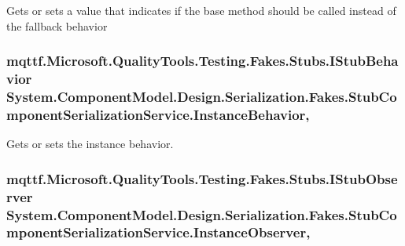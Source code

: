 Gets or sets a value that indicates if the base method should be called instead of the fallback behavior

\hypertarget{class_system_1_1_component_model_1_1_design_1_1_serialization_1_1_fakes_1_1_stub_component_serialization_service_a3d7ed33bcf64bea04776fd4308f7a612}{
\subsubsection[{Instance\-Behavior}]{\setlength{\rightskip}{0pt plus 5cm}mqttf.\-Microsoft.\-Quality\-Tools.\-Testing.\-Fakes.\-Stubs.\-I\-Stub\-Behavior System.\-Component\-Model.\-Design.\-Serialization.\-Fakes.\-Stub\-Component\-Serialization\-Service.\-Instance\-Behavior\hspace{0.3cm}{\ttfamily [get]}, {\ttfamily [set]}}}\label{class_system_1_1_component_model_1_1_design_1_1_serialization_1_1_fakes_1_1_stub_component_serialization_service_a3d7ed33bcf64bea04776fd4308f7a612}


Gets or sets the instance behavior.

\hypertarget{class_system_1_1_component_model_1_1_design_1_1_serialization_1_1_fakes_1_1_stub_component_serialization_service_ac3604c50cf8ba19389054eec8a5bb549}{
\subsubsection[{Instance\-Observer}]{\setlength{\rightskip}{0pt plus 5cm}mqttf.\-Microsoft.\-Quality\-Tools.\-Testing.\-Fakes.\-Stubs.\-I\-Stub\-Observer System.\-Component\-Model.\-Design.\-Serialization.\-Fakes.\-Stub\-Component\-Serialization\-Service.\-Instance\-Observer\hspace{0.3cm}{\ttfamily [get]}, {\ttfamily [set]}}}\label{class_system_1_1_component_model_1_1_design_1_1_serialization_1_1_fakes_1_1_stub_component_serialization_service_ac3604c50cf8ba19389054eec8a5bb549}


